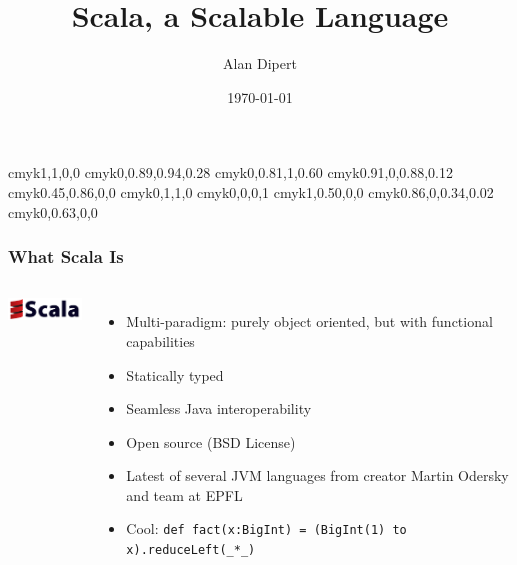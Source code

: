           {cmyk}{1,1,0,0}
      {cmyk}{0,0.89,0.94,0.28}
         {cmyk}{0,0.81,1,0.60}
   {cmyk}{0.91,0,0.88,0.12}
        {cmyk}{0.45,0.86,0,0}
           {cmyk}{0,1,1,0}
         {cmyk}{0,0,0,1}
     {cmyk}{1,0.50,0,0}
      {cmyk}{0.86,0,0.34,0.02}
 {cmyk}{0,0.63,0,0}

\title{Scala, a Scalable Language} 
\author{Alan Dipert} 
\date{\today} 

 
\maketitle 

\begin{frame} 
\frametitle{What Scala Is}
\begin{columns}[c]
  \column{0.5in}
    \includegraphics[width=1.0in]{graphics/scala_logo.png} 
  \column{2.5in}
    \begin{itemize}
      \item<1-> Multi-paradigm: purely object oriented, but with functional capabilities
      \item<2-> Statically typed
      \item<3-> Seamless Java interoperability
      \item<4-> Open source (BSD License)
      \item<5-> Latest of several JVM languages from creator Martin Odersky and team at EPFL
      \item<6-> Cool: \tt\small{def fact(x:BigInt) = (BigInt(1) to x).reduceLeft(\_*\_)}
    \end{itemize}
\end{columns}
\end{frame} 

